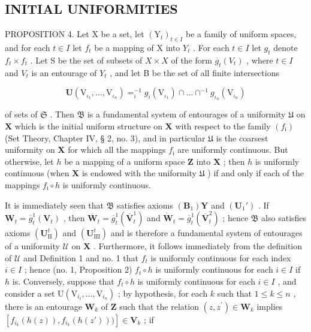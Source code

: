 \subsection{INITIAL UNIFORMITIES}

PROPOSITION 4. Let X be a set, let \((\mathrm{Y}_{t})_{t\in I}\) be a family of uniform spaces, and for each \(t\in I\) let \(f_{t}\) be a mapping of X into \(Y_{t}\) . For each \(t\in I\) let \(g_{t}\) denote \(f_{t}\times f_{t}\) . Let S be the set of subsets of \(X\times X\) of the form \(\overline{g}_{t}(V_{t})\) , where \(t\in I\) and \(V_{t}\) is an entourage of \(Y_{t}\) , and let B be the set of all finite intersections

\[
\mathbf {U} \left(\mathrm{V} _ {\iota_ {1}}, \dots , \mathrm{V} _ {\iota_ {n}}\right) = _ {i} ^ {- 1} g _ {i} \left(\mathrm{V} _ {\iota_ {1}}\right) \cap \dots \cap^ {- 1} g _ {\iota_ {n}} \left(\mathrm{V} _ {\iota_ {n}}\right)\tag{1}
\]

of sets of \(\mathfrak{S}\) . Then \(\mathfrak{B}\) is a fundamental system of entourages of a uniformity \(\mathfrak{U}\) on \(\mathbf{X}\) which is the initial uniform structure on \(\mathbf{X}\) with respect to the family \((f_{\mathfrak{i}})\) (Set Theory, Chapter IV, § 2, no. 3), and in particular \(\mathfrak{U}\) is the coarsest uniformity on \(\mathbf{X}\) for which all the mappings \(f_{\mathfrak{i}}\) are uniformly continuous. But otherwise, let \(h\) be a mapping of a uniform space \(\mathbf{Z}\) into \(\mathbf{X}\) ; then \(h\) is uniformly continuous (when \(\mathbf{X}\) is endowed with the uniformity \(\mathfrak{U}\) ) if and only if each of the mappings \(f_{\mathfrak{i}} \circ h\) is uniformly continuous.

It is immediately seen that \(\mathfrak{B}\) satisfies axioms \((\mathbf{B}_1)\mathbf{Y}\) and \((\mathbf{U}_1')\) . If \(\mathbf{W}_t = \overline{g}_t^1 (\mathbf{V}_t)\) , then \(\overline{\mathbf{W}}_t = \overline{g}_t^1 (\overline{\mathbf{V}}_t^1)\) and \(\dot{\mathbf{W}}_t = \overline{g}_t^1 (\overline{\mathbf{V}}_t^2)\) ; hence \(\mathfrak{B}\) also satisfies axioms \((\mathbf{U}_{\mathrm{II}}^t)\) and \((\mathbf{U}_{\mathrm{III}}^t)\) and is therefore a fundamental system of entourages of a uniformity \(\mathcal{U}\) on \(\mathbf{X}\) . Furthermore, it follows immediately from the definition of \(\mathcal{U}\) and Definition 1 and no. 1 that \(f_{t}\) is uniformly continuous for each index \(i\in I\) ; hence (no. 1, Proposition 2) \(f_{t}\circ h\) is uniformly continuous for each \(i\in I\) if \(h\) is. Conversely, suppose that \(f_{t}\circ h\) is uniformly continuous for each \(i\in I\) , and consider a set \(\mathrm{U}(\mathrm{V}_{i_t},\dots,\mathrm{V}_{i_n})\) ; by hypothesis, for each \(k\) such that \(1\leqslant k\leqslant n\) , there is an entourage \(\mathbf{W}_k\) of \(\mathbf{Z}\) such that the relation \((z,z^{\prime})\in \mathbf{W}_k\) implies \([f_{i_k}(h(z)),f_{i_k}(h(z')))]\in \mathbf{V}_k\) ; if

